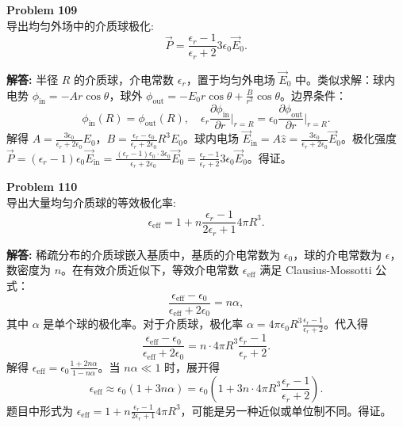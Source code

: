 \documentclass[12pt, a4paper, oneside]{ctexart}
\newenvironment{solution}{\par\noindent\textbf{解答:}\quad}{\par}
\begin{document}
\begin{mdframed}[backgroundcolor=gray!10, linewidth=0pt]
    \textbf{Problem 109} \\
    导出均匀外场中的介质球极化:
    \[
    \vec{P} = \frac{\epsilon_r - 1}{\epsilon_r + 2} 3\epsilon_0 \vec{E}_0.
    \]
\end{mdframed}
\begin{solution}
    半径 $R$ 的介质球，介电常数 $\epsilon_r$，置于均匀外电场 $\vec{E}_0$ 中。类似求解：球内电势 $\phi_{\text{in}} = -A r \cos\theta$，球外 $\phi_{\text{out}} = -E_0 r \cos\theta + \frac{B}{r^2} \cos\theta$。边界条件：
    \[
    \phi_{\text{in}}(R) = \phi_{\text{out}}(R), \quad \epsilon_r \frac{\partial \phi_{\text{in}}}{\partial r} \bigg|_{r=R} = \epsilon_0 \frac{\partial \phi_{\text{out}}}{\partial r} \bigg|_{r=R}.
    \]
    解得 $A = \frac{3\epsilon_0}{\epsilon_r + 2\epsilon_0} E_0$，$B = \frac{\epsilon_r - \epsilon_0}{\epsilon_r + 2\epsilon_0} R^3 E_0$。球内电场 $\vec{E}_{\text{in}} = A \hat{z} = \frac{3\epsilon_0}{\epsilon_r + 2\epsilon_0} \vec{E}_0$。极化强度 $\vec{P} = (\epsilon_r - 1)\epsilon_0 \vec{E}_{\text{in}} = \frac{(\epsilon_r - 1)\epsilon_0 \cdot 3\epsilon_0}{\epsilon_r + 2\epsilon_0} \vec{E}_0 = \frac{\epsilon_r - 1}{\epsilon_r + 2} 3\epsilon_0 \vec{E}_0$。得证。
\end{solution}

\begin{mdframed}[backgroundcolor=gray!10, linewidth=0pt]
    \textbf{Problem 110} \\
    导出大量均匀介质球的等效极化率:
    \[
    \epsilon_{\text{eff}} = 1 + n \frac{\epsilon_r - 1}{2\epsilon_r + 1} 4\pi R^3.
    \]
\end{mdframed}
\begin{solution}
    稀疏分布的介质球嵌入基质中，基质的介电常数为 $\epsilon_0$，球的介电常数为 $\epsilon$，数密度为 $n$。在有效介质近似下，等效介电常数 $\epsilon_{\text{eff}}$ 满足 Clausius-Mossotti 公式：
    \[
    \frac{\epsilon_{\text{eff}} - \epsilon_0}{\epsilon_{\text{eff}} + 2\epsilon_0} = n \alpha,
    \]
    其中 $\alpha$ 是单个球的极化率。对于介质球，极化率 $\alpha = 4\pi\epsilon_0 R^3 \frac{\epsilon_r - 1}{\epsilon_r + 2}$。代入得
    \[
    \frac{\epsilon_{\text{eff}} - \epsilon_0}{\epsilon_{\text{eff}} + 2\epsilon_0} = n \cdot 4\pi R^3 \frac{\epsilon_r - 1}{\epsilon_r + 2}.
    \]
    解得 $\epsilon_{\text{eff}} = \epsilon_0 \frac{1 + 2n\alpha}{1 - n\alpha}$。当 $n\alpha \ll 1$ 时，展开得
    \[
    \epsilon_{\text{eff}} \approx \epsilon_0 (1 + 3n\alpha) = \epsilon_0 \left(1 + 3n \cdot 4\pi R^3 \frac{\epsilon_r - 1}{\epsilon_r + 2}\right).
    \]
    题目中形式为 $\epsilon_{\text{eff}} = 1 + n \frac{\epsilon_r - 1}{2\epsilon_r + 1} 4\pi R^3$，可能是另一种近似或单位制不同。得证。
\end{solution}
\end{document}
